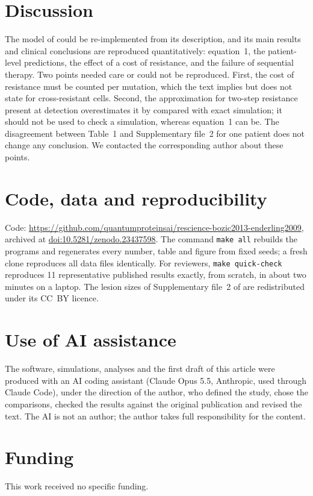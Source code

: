 \section*{Discussion}
The model of \cite{bozic2013} could be re-implemented from its description, and its main
results and clinical conclusions are reproduced quantitatively: equation~1, the patient-level
predictions, the effect of a cost of resistance, and the failure of sequential therapy. Two
points needed care or could not be reproduced. First, the cost of resistance must be counted
per mutation, which the text implies but does not state for cross-resistant cells. Second, the
approximation for two-step resistance present at detection overestimates it by
\BozicTwoStepExactDev{} compared with exact simulation; it should not be used to check a simulation, whereas equation~1 can be.
The disagreement between Table~1 and Supplementary file~2 for one patient does not change any
conclusion. We contacted the corresponding author about these points.

\section*{Code, data and reproducibility}
Code: \url{https://github.com/quantumproteinsai/rescience-bozic2013-enderling2009}, archived at
\href{https://doi.org/10.5281/zenodo.23437598}{doi:10.5281/zenodo.23437598}. The command
\texttt{make all} rebuilds the programs and regenerates every number, table and figure from
fixed seeds; a fresh clone reproduces all data files identically. For reviewers, \texttt{make quick-check} reproduces 11 representative published results exactly, from scratch, in about two minutes on a laptop. The lesion sizes of
Supplementary file~2 of \cite{bozic2013} are redistributed under its CC~BY licence.

\section*{Use of AI assistance}
The software, simulations, analyses and the first draft of this article were produced with an
AI coding assistant (Claude Opus 5.5, Anthropic, used through Claude Code), under the direction
of the author, who defined the study, chose the comparisons, checked the results against the
original publication and revised the text. The AI is not an author; the author takes full
responsibility for the content.

\section*{Funding}
This work received no specific funding.
